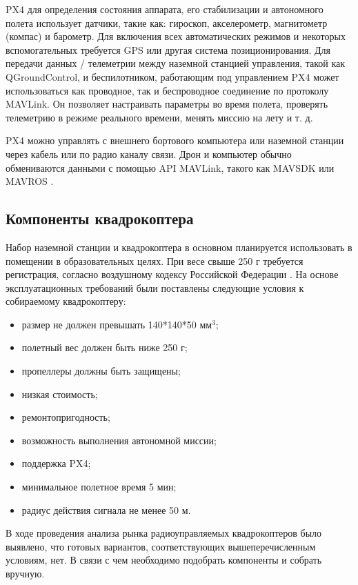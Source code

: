 PX4 для определения состояния аппарата, его стабилизации и автономного полета использует датчики, такие как: гироскоп, акселерометр, магнитометр (компас) и барометр. Для включения всех автоматических режимов и некоторых вспомогательных требуется GPS или другая система позиционирования.
Для передачи данных / телеметрии между наземной станцией управления, такой как Q\-Ground\-Control, и беспилотником, работающим под управлением PX4 может использоваться как проводное, так и беспроводное соединение по протоколу MAVLink. Он позволяет настраивать параметры во время полета, проверять телеметрию в режиме реального времени, менять миссию на лету и т. д.

PX4 можно управлять с внешнего бортового компьютера или наземной станции через кабель или по радио каналу связи. Дрон и компьютер обычно обмениваются данными с помощью API MAVLink, такого как MAVSDK или MAVROS \cite{px4}.

\subsection{Компоненты квадрокоптера}

Набор наземной станции и квадрокоптера в основном планируется использовать в помещении в образовательных целях. При весе свыше 250 г требуется регистрация, согласно воздушному кодексу Российской Федерации \cite{ivp}. На основе эксплуатационных требований были поставлены следующие условия к собираемому квадрокоптеру:
\begin{itemize}
	\item размер не должен превышать 140*140*50 \(мм^3\);
	\item полетный вес должен быть ниже 250 г;
	\item пропеллеры должны быть защищены;
	\item низкая стоимость;
	\item ремонтопригодность;
	\item возможность выполнения автономной миссии;
	\item поддержка PX4;
	\item минимальное полетное время 5 мин;
	\item радиус действия сигнала не менее 50 м.
\end{itemize}

В ходе проведения анализа рынка радиоуправляемых квадрокоптеров было выявлено, что готовых вариантов, соответствующих вышеперечисленным условиям, нет. В связи с чем необходимо подобрать компоненты и собрать вручную.


